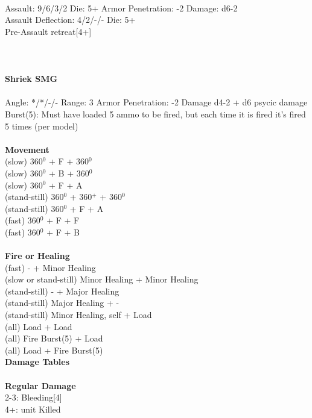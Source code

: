 \ \\
Assault: 9/6/3/2 Die: 5+ Armor Penetration: -2 Damage: d6-2 \\
Assault Deflection: 4/2/-/- Die: 5+\\
\indent Pre-Assault retreat[4+] \\
\ \\

\ \\
\ \\
{\bf Shriek SMG } \\
\ \\
Angle: */*/-/- Range: 3 Armor Penetration: -2 Damage d4-2 + d6 psycic damage \\
\indent Burst(5): Must have loaded 5 ammo to be fired, but each time it is fired it's fired 5 times (per model) \\





\ \\ {\bf Movement } \\
(slow) 360$^0$ + F + 360$^0$ \\
(slow) 360$^0$ + B + 360$^0$ \\
(slow) 360$^0$ + F + A \\
(stand-still) 360$^0$ + 360$^+$ + 360$^0$ \\
(stand-still) 360$^0$ + F + A \\
(fast) 360$^0$ + F + F \\
(fast) 360$^0$ + F + B \\
\ \\ {\bf Fire or Healing } \\
(fast) - + Minor Healing \\
(slow or stand-still) Minor Healing + Minor Healing \\
(stand-still) - + Major Healing \\
(stand-still) Major Healing + - \\
(stand-still) Minor Healing, self + Load  \\
(all) Load + Load \\
(all) Fire Burst(5) + Load \\
(all) Load + Fire Burst(5) \\



{\bf Damage Tables} \\
\ \\ {\bf Regular Damage } \\
2-3: Bleeding[4] \\
4+: unit Killed \\


